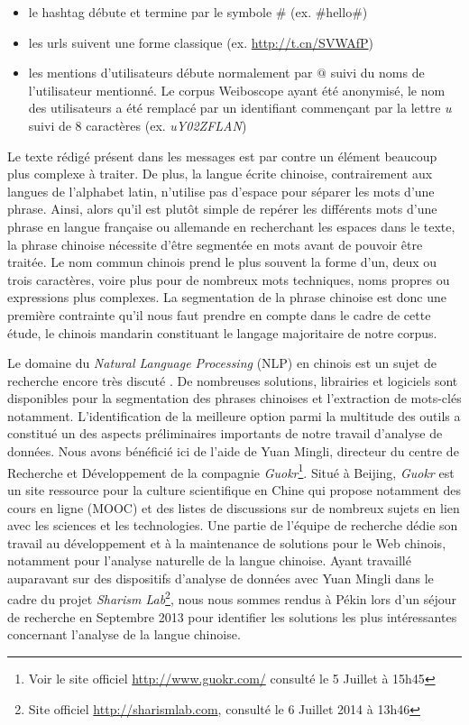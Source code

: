     \begin{itemize}
     \item le hashtag débute et termine par le symbole \# (ex. \#hello\#)
     \item les urls suivent une forme classique (ex. \url{http://t.cn/SVWAfP}) 
     \item les mentions d'utilisateurs débute normalement par $@$ suivi du noms de l'utilisateur mentionné. Le corpus Weiboscope ayant été anonymisé, le nom des utilisateurs a été remplacé par un identifiant commençant par la lettre \textit{u} suivi de 8 caractères (ex. \textit{uY02ZFLAN})
    \end{itemize}

    Le texte rédigé présent dans les messages est par contre un élément beaucoup plus complexe à traiter. De plus, la langue écrite chinoise, contrairement aux langues de l'alphabet latin, n'utilise pas d'espace pour séparer les mots d'une phrase. Ainsi, alors qu'il est plutôt simple de repérer les différents mots d'une phrase en langue française ou allemande en recherchant les espaces dans le texte, la phrase chinoise nécessite d'être segmentée en mots avant de pouvoir être traitée. Le nom commun chinois prend le plus souvent la forme d'un, deux ou trois caractères, voire plus pour de nombreux mots techniques, noms propres ou expressions plus complexes. La segmentation de la phrase chinoise est donc une  première contrainte qu'il nous faut prendre en compte dans le cadre de cette étude, le chinois mandarin constituant le langage majoritaire de notre corpus. 

    Le domaine du \textit{Natural Language Processing} (NLP) en chinois est un sujet de recherche encore très discuté \citep{Qiu2013}. De nombreuses solutions, librairies et logiciels sont disponibles pour la segmentation des phrases chinoises et l'extraction de mots-clés notamment. L{\textquoteright}identification de la meilleure option parmi la multitude des outils a constitué un des aspects préliminaires importants de notre travail d{\textquoteright}analyse de données. Nous avons bénéficié ici de l'aide de Yuan Mingli, directeur du centre de Recherche et Développement de la compagnie \textit{Guokr}\footnote{Voir le site officiel \url{http://www.guokr.com/} consulté le 5 Juillet à 15h45}. Situé à Beijing, \textit{Guokr} est un site ressource pour la culture scientifique en Chine qui propose notamment des cours en ligne (MOOC) et des listes de discussions sur de nombreux sujets en lien avec les sciences et les technologies. Une partie de l'équipe de recherche dédie son travail au développement et à la maintenance de solutions pour le Web chinois, notamment pour l'analyse naturelle de la langue chinoise. Ayant travaillé auparavant sur des dispositifs d'analyse de données avec Yuan Mingli dans le cadre du projet \textit{Sharism Lab}\footnote{Site officiel \url{http://sharismlab.com}, consulté le 6 Juillet 2014 à 13h46}, nous nous sommes rendus à Pékin lors d'un séjour de recherche en Septembre 2013 pour identifier les solutions les plus intéressantes concernant l'analyse de la langue chinoise.

